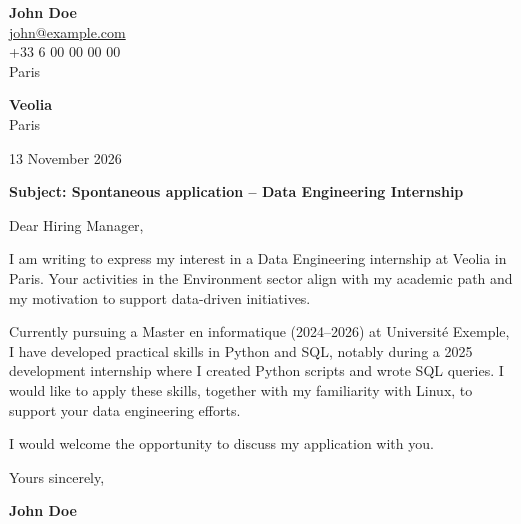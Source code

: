 \documentclass[11pt,a4paper]{article}
\begin{document}
{\Large\bfseries John Doe}\\[0.3cm]


\href{mailto:john@example.com}{john@example.com}\\



+33 6 00 00 00 00\\



Paris\\


\vspace{1cm}

\begin{flushright}

\textbf{Veolia}\\



Paris\\


\vspace{0.5cm}

13 November 2026

\end{flushright}

\vspace{0.8cm}

\textbf{Subject: Spontaneous application – Data Engineering Internship}

\vspace{0.6cm}


Dear Hiring Manager,


\vspace{0.5cm}

\justifying


I am writing to express my interest in a Data Engineering internship at Veolia in Paris. Your activities in the Environment sector align with my academic path and my motivation to support data-driven initiatives.

\par

Currently pursuing a Master en informatique (2024–2026) at Université Exemple, I have developed practical skills in Python and SQL, notably during a 2025 development internship where I created Python scripts and wrote SQL queries. I would like to apply these skills, together with my familiarity with Linux, to support your data engineering efforts.

\par

I would welcome the opportunity to discuss my application with you.

\par


\vspace{0.7cm}


Yours sincerely,


\vspace{0.5cm}

\textbf{John Doe}
\end{document}
